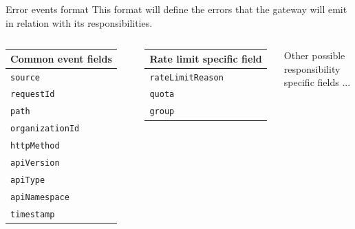 \documentclass[10pt]{beamer}
\begin{document}
\begin{frame}{Error events format}
    This format will define the errors that the gateway will emit in relation with its responsibilities.
    \vspace{0.5cm}
    \begin{columns}
        \begin{table}[]
            \centering
            \begin{tabular}{|l|}
                \hline
                Common event fields     \\ \hline \hline
                \texttt{source}         \\ \hline
                \texttt{requestId}      \\ \hline
                \texttt{path}           \\ \hline
                \texttt{organizationId} \\ \hline
                \texttt{httpMethod}     \\ \hline
                \texttt{apiVersion}     \\ \hline
                \texttt{apiType}        \\ \hline
                \texttt{apiNamespace}   \\ \hline
                \texttt{timestamp}      \\ \hline
            \end{tabular}
        \end{table}
        
        \begin{table}[]
            \centering
            \begin{tabular}{|l|}
                \hline
            Rate limit specific field   \\ \hline \hline
                \texttt{rateLimitReason}\\ \hline
                \texttt{quota}          \\ \hline
                \texttt{group}          \\ \hline
            \end{tabular}
        \end{table}
        \vspace{1.0cm}
        \centering
        Other possible responsibility specific fields ...
    \end{columns}
\end{frame}
\end{document}
